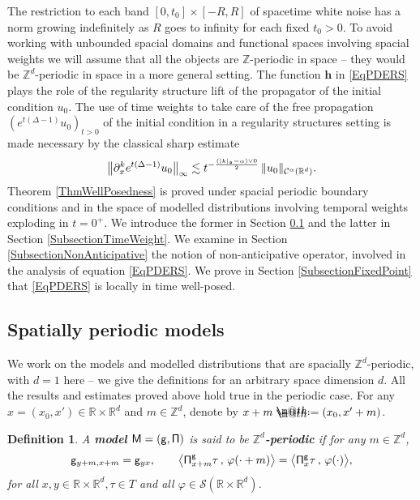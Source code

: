 \documentclass[10pt, reqno]{amsart}
\makeatletter
\numberwithin{subsection}{section}
\numberwithin{subsubsection}{subsection}
\numberwithin{equation}{section} %
\theoremstyle{mystyle}
\theoremstyle{mystyle2}
\newtheorem*{defn*} {Definition}
\theoremstyle{mystyle3}
\newcommand{\bsh}{\boldsymbol{h}}
\newcommand{\ssk}{\smallskip}
\newcommand\bbR{\mathbb{R}}
\newcommand\bbZ{\mathbb{Z}}
\newcommand{\mcC}{\mathcal{C}}
\newcommand\mcS{\mathcal{S}}
\newcommand*{\defeq}{\mathrel{\rlap{%
                     \raisebox{0.3ex}{$\m@th\cdot$}}%
                     \raisebox{-0.3ex}{$\m@th\cdot$}}%
                     =}
\makeatother
\begin{document}
\ssk

The restriction to each band $[0,t_0]\times [-R,R]$ of spacetime white noise has a norm growing indefinitely as $R$ goes to infinity for each fixed $t_0>0$. To avoid working with unbounded spacial domains and functional spaces involving spacial weights we will assume that all the objects are $\bbZ$-periodic in space -- they would be $\bbZ^d$-periodic in space in a more general setting. The function $\bsh$ in \eqref{EqPDERS} plays the role of the regularity structure lift of the propagator of the initial condition $u_0$. The use of time weights to take care of the free propagation $(e^{ t(\Delta-1) }u_0)_{t>0}$ of the initial condition in a regularity structures setting is made necessary by the classical sharp estimate
\begin{equation} \label{EqSchauderHeatSemigroup}
\big\| \partial_x^k e^{ t(\Delta-1) }u_0\big\|_\infty \lesssim 
t^{-\frac{(\vert k\vert_\frak{s}-\alpha)\vee0}{2}}
\,\|u_0\|_{\mcC^\alpha(\bbR^d)}.
\end{equation}
Theorem \ref{ThmWellPosedness} is proved under spacial periodic boundary conditions and in the space of modelled distributions involving temporal weights exploding in $t=0^+$. We introduce the former in Section \ref{SubsectionPeriodicModel} and the latter in Section \ref{SubsectionTimeWeight}. We examine in Section \ref{SubsectionNonAnticipative} the notion of non-anticipative operator, involved in the analysis of equation \eqref{EqPDERS}. We prove in Section \ref{SubsectionFixedPoint} that \eqref{EqPDERS} is locally in time well-posed.


\bigskip



\subsection{Spatially periodic models}
\label{SubsectionPeriodicModel}

We work on the models and modelled distributions that are spacially $\bbZ^d$-periodic, with $d=1$ here -- we give the definitions for an arbitrary space dimension $d$. All the results and estimates proved above hold true in the periodic case. For any $x=(x_0,x')\in\bbR\times\bbR^d$ and $m\in\bbZ^d$, denote by $x+m\defeq (x_0,x'+m)$.

\medskip

\begin{defn*}
A \textbf{\textsf{model}} $\sf M = (g,\Pi)$ is said to be $\bbZ^d$\textbf{\textsf{-periodic}} if 
for any $m\in\bbZ^d$,
\begin{align*}
{\sf g}_{y+m,x+m} = {\sf g}_{yx},\qquad
\big\langle {\sf \Pi}^{\sf g}_{x+m}\tau \,,\,\varphi(\cdot+m) \big\rangle 
= \big\langle {\sf \Pi}^{\sf g}_x\tau \,,\,\varphi(\cdot) \big\rangle,
\end{align*}
for all $x,y\in\bbR\times\bbR^d, \tau\in T$ and all $\varphi\in\mcS(\bbR\times\bbR^d)$.   
\end{defn*}
\end{document}
